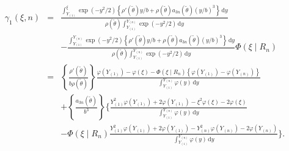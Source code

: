 \documentclass[oneside,english]{amsbook}
\numberwithin{section}{chapter}
\numberwithin{equation}{section}
\numberwithin{figure}{section}
\theoremstyle{plain}
\theoremstyle{plain}
\theoremstyle{definition}
\theoremstyle{plain}
\theoremstyle{plain}
\theoremstyle{remark}
\theoremstyle{definition}
\theoremstyle{definition}
\newcommand{\diff}{\,\mathrm{d}}
\begin{document}
\begin{eqnarray*}
\gamma_{1}\left(\xi,n\right) & = & \frac{\int_{Y_{\left(1\right)}}^{\xi}\exp\left(-y^{2}/2\right)\left\{ \rho'\left(\tilde{\theta}\right)y/b+\rho\left(\tilde{\theta}\right)a_{3n}\left(\tilde{\theta}\right)\left(y/b\right)^{3}\right\} \diff y}{\rho\left(\tilde{\theta}\right)\int_{Y_{\left(1\right)}}^{Y_{\left(n\right)}}\exp\left(-y^{2}/2\right)\diff y}\\
 &  & -\frac{\int_{Y_{\left(1\right)}}^{Y_{\left(n\right)}}\exp\left(-y^{2}/2\right)\left\{ \rho'\left(\tilde{\theta}\right)y/b+\rho\left(\tilde{\theta}\right)a_{3n}\left(\tilde{\theta}\right)\left(y/b\right)^{3}\right\} \diff y}{\rho\left(\tilde{\theta}\right)\int_{Y_{\left(1\right)}}^{Y_{\left(n\right)}}\exp\left(-y^{2}/2\right)\diff y}\Phi\left(\xi\mid R_{n}\right)\\
 & = & \left\{ \frac{\rho'\left(\tilde{\theta}\right)}{b\rho\left(\tilde{\theta}\right)}\right\} \frac{\varphi\left(Y_{\left(1\right)}\right)-\varphi\left(\xi\right)-\Phi\left(\xi\mid R_{n}\right)\left\{ \varphi\left(Y_{\left(1\right)}\right)-\varphi\left(Y_{\left(n\right)}\right)\right\} }{\int_{Y_{\left(1\right)}}^{Y_{\left(n\right)}}\varphi\left(y\right)\diff y}\\
 &  & +\left\{ \frac{a_{3n}\left(\tilde{\theta}\right)}{b^{3}}\right\} \Bigg\{\frac{Y_{\left(1\right)}^{2}\varphi\left(Y_{\left(1\right)}\right)+2\varphi\left(Y_{\left(1\right)}\right)-\xi^{2}\varphi\left(\xi\right)-2\varphi\left(\xi\right)}{\int_{Y_{\left(1\right)}}^{Y_{\left(n\right)}}\varphi\left(y\right)\diff y}\\
 &  & -\Phi\left(\xi\mid R_{n}\right)\frac{Y_{\left(1\right)}^{2}\varphi\left(Y_{\left(1\right)}\right)+2\varphi\left(Y_{\left(1\right)}\right)-Y_{\left(n\right)}^{2}\varphi\left(Y_{\left(n\right)}\right)-2\varphi\left(Y_{\left(n\right)}\right)}{\int_{Y_{\left(1\right)}}^{Y_{\left(n\right)}}\varphi\left(y\right)\diff y}\Bigg\}.
\end{eqnarray*}
 
\end{document}
